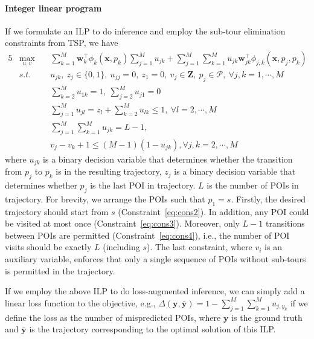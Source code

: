 \paragraph{Integer linear program}
If we formulate an ILP to do inference and employ the sub-tour elimination constraints from TSP, we have
\begin{alignat}{5}
& \max_{u,v} ~&& \sum_{k=1}^M \mathbf{w}_k^\top \phi_k(\mathbf{x}, p_k) \sum_{j=1}^M u_{jk} + 
                 \sum_{j=1}^M \sum_{k=1}^M u_{jk} \mathbf{w}_{jk}^\top \phi_{j, k}(\mathbf{x}, p_j, p_k) \\
& s.t. ~~ ~&& u_{jk}, ~z_j \in \{0, 1\}, ~u_{jj}=0, ~z_1=0, ~v_j \in \mathbf{Z},~ p_j \in \mathcal{P}, ~\forall j, k = 1,\cdots,M   \label{eq:cons1} \\
&          && \sum_{k=2}^M u_{1k} = 1, ~\sum_{j=2}^M u_{j1} = 0  \label{eq:cons2} \\
&          && \sum_{j=1}^M u_{jl} = z_l + \sum_{k=2}^M u_{lk} \le 1,   ~\forall l=2,\cdots,M                    \label{eq:cons3} \\
&          && \sum_{j=1}^M \sum_{k=1}^M u_{jk} = L-1,                                                           \label{eq:cons4} \\
&          && v_j - v_k + 1 \le (M-1) (1-u_{jk}),                     \forall j,k=2,\cdots,M                    \label{eq:cons5}
\end{alignat}
where $u_{jk}$ is a binary decision variable that determines whether the transition from $p_j$ to $p_k$ is in the resulting trajectory,
$z_j$ is a binary decision variable that determines whether $p_j$ is the last POI in trajectory.
$L$ is the number of POIs in trajectory.
For brevity, we arrange the POIs such that $p_1 = s$.
Firstly, the desired trajectory should start from $s$ (Constraint~\ref{eq:cons2}).
In addition, any POI could be visited at most once (Constraint~\ref{eq:cons3}).
Moreover, only $L-1$ transitions between POIs are permitted (Constraint~\ref{eq:cons4}),
i.e., the number of POI visits should be exactly $L$ (including $s$).
The last constraint, where $v_i$ is an auxiliary variable,
enforces that only a single sequence of POIs without sub-tours is permitted in the trajectory.

If we employ the above ILP to do loss-augmented inference, we can simply add a linear loss function to the objective, 
e.g., $\Delta(\mathbf{y}, \bar{\mathbf{y}}) = 1 - \sum_{j=1}^M \sum_{k=1}^M u_{j, y_k}$ if we define the loss as the number of mispredicted POIs,
where $\mathbf{y}$ is the ground truth and $\bar{\mathbf{y}}$ is the trajectory corresponding to the optimal solution of this ILP.

